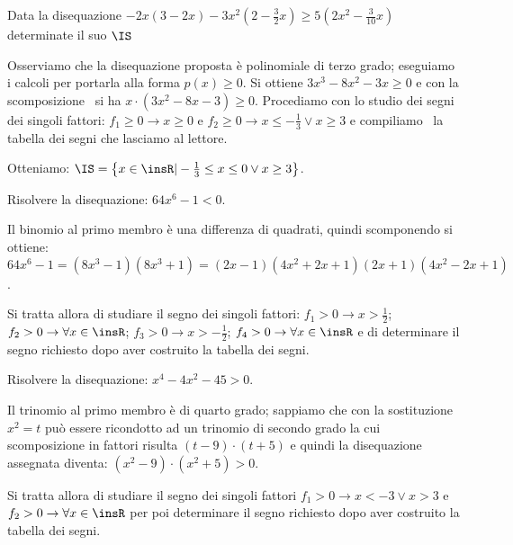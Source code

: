 \begin{exrig}
\begin{esempio}
Data la disequazione $-2x(3-2x)-3x^2\left(2-\frac 3 2x\right)\ge 5\left(2x^2-\frac 3{10}x\right)$ determinate il suo $ \IS $

Osserviamo che la disequazione proposta è polinomiale di terzo grado; eseguiamo i calcoli per portarla alla forma $p(x)\ge 0$. Si ottiene $3x^3-8x^2-3x\ge 0$ e con la scomposizione \ si ha $x\cdot (3x^2-8x-3)\ge 0$. Procediamo con lo studio dei segni dei singoli fattori: $f_1\ge 0\rightarrow x\ge 0$ e $f_2\ge 0\rightarrow x\le -\frac 1 3\vee x\ge 3$ e compiliamo \ la tabella dei segni che lasciamo al lettore.
\begin{center}
 
\end{center}
Otteniamo: $\IS=\left\{x\in \insR | -\frac 1 3\le x\le 0\vee x\ge 3\right\}$.
\end{esempio}

\begin{esempio}
Risolvere la disequazione: $64x^6-1<0$.

Il binomio al primo membro è una differenza di quadrati, quindi scomponendo si ottiene: $64x^6-1=(8x^3-1)(8x^3+1)=(2x-1)(4x^2+2x+1)(2x+1)(4x^2-2x+1)$.

Si tratta allora di studiare il segno dei singoli fattori: $f_1>0\to x>\frac 1 2$; $f_2>0\to \forall x\in \insR$; $f_3>0\to x>-\frac 1 2$; $f_4>0\to \forall x\in \insR$ e di determinare il segno richiesto dopo aver costruito la tabella dei segni.
\end{esempio}

\begin{esempio}
Risolvere la disequazione: $x^4-4x^2-45>0$.

Il trinomio al primo membro è di quarto grado; sappiamo che con la sostituzione $x^2=t$ può essere ricondotto ad un trinomio di secondo grado la cui scomposizione in fattori risulta $(t-9)\cdot (t+5)$ e quindi la disequazione assegnata diventa: $(x^2-9)\cdot (x^2+5)>0$.

Si tratta allora di studiare il segno dei singoli fattori $f_1>0\to x<-3\vee x>3$ e $f_2>0\to \forall x\in \insR$ per poi determinare il segno richiesto dopo aver costruito la tabella dei segni.
\end{esempio}
\end{exrig}
\vspazio\ovalbox{\risolvii \ref{ese:4.32}, \ref{ese:4.33}, \ref{ese:4.34}, \ref{ese:4.35}, \ref{ese:4.36}, \ref{ese:4.37}, \ref{ese:4.38}, \ref{ese:4.39}, \ref{ese:4.40}, \ref{ese:4.41}, \ref{ese:4.42}, \ref{ese:4.43}, \ref {ese:4.44},}

